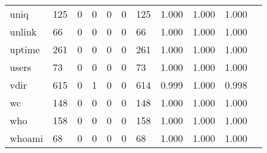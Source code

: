 \begin{longtable}{lp{1.10cm}p{1.10cm}p{1.10cm}p{1.10cm}p{1.10cm}p{1.10cm}p{1.10cm}p{1.10cm}p{1.10cm}p{1.10cm}}
uniq      &                    125 &                                  0 &                                 0 &                                0 &                                 0 &                             125 &                          1.000 &                                 1.000 &                               1.000 \\
unlink    &                     66 &                                  0 &                                 0 &                                0 &                                 0 &                              66 &                          1.000 &                                 1.000 &                               1.000 \\
uptime    &                    261 &                                  0 &                                 0 &                                0 &                                 0 &                             261 &                          1.000 &                                 1.000 &                               1.000 \\
users     &                     73 &                                  0 &                                 0 &                                0 &                                 0 &                              73 &                          1.000 &                                 1.000 &                               1.000 \\
vdir      &                    615 &                                  0 &                                 1 &                                0 &                                 0 &                             614 &                          0.999 &                                 1.000 &                               0.998 \\
wc        &                    148 &                                  0 &                                 0 &                                0 &                                 0 &                             148 &                          1.000 &                                 1.000 &                               1.000 \\
who       &                    158 &                                  0 &                                 0 &                                0 &                                 0 &                             158 &                          1.000 &                                 1.000 &                               1.000 \\
whoami    &                     68 &                                  0 &                                 0 &                                0 &                                 0 &                              68 &                          1.000 &                                 1.000 &                               1.000 \\

\end{longtable}
